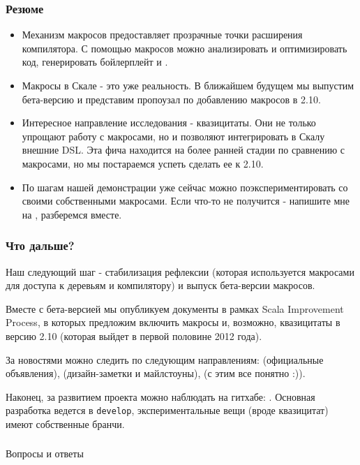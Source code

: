 \documentclass[hyperref={bookmarks=false}]{beamer}
\begin{document}
\begin{frame}[t,fragile]
\frametitle{Резюме}
\begin{itemize}
\item Механизм макросов предоставляет прозрачные точки расширения компилятора. С помощью макросов можно  анализировать и оптимизировать код, генерировать бойлерплейт и .
\item Макросы в Скале - это уже реальность. В ближайшем будущем мы выпустим бета-версию и представим пропоузал по добавлению макросов в 2.10.
\item Интересное направление исследования - квазицитаты. Они не только упрощают работу с макросами, но и позволяют интегрировать в Скалу внешние DSL. Эта фича находится на более ранней стадии по сравнению с макросами, но мы постараемся успеть сделать ее к 2.10.
\item По шагам нашей демонстрации уже сейчас можно поэкспериментировать со своими собственными макросами. Если что-то не получится - напишите мне на , разберемся вместе.
\end{itemize}
\end{frame}

\begin{frame}[t,fragile]
\frametitle{Что дальше?}

Наш следующий шаг - стабилизация рефлексии (которая используется макросами для доступа к деревьям и компилятору) и выпуск бета-версии макросов.

Вместе с бета-версией мы опубликуем документы в рамках Scala Improvement Process, в которых предложим включить макросы и, возможно, квазицитаты в версию 2.10 (которая выйдет в первой половине 2012 года).

За новостями можно следить по следующим направлениям:  (официальные объявления),  (дизайн-заметки и майлстоуны),  (с этим все понятно :)).

Наконец, за развитием проекта можно наблюдать на гитхабе: . Основная разработка ведется в \texttt{develop}, экспериментальные вещи (вроде квазицитат) имеют собственные бранчи.
\end{frame}

\begin{frame}[c, fragile]
\frametitle{}

\centering
{\Large Вопросы и ответы}\\

\centering
{}

\end{frame}
\end{document}
